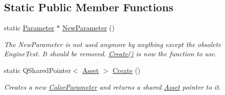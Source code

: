 \subsection*{Static Public Member Functions}
\begin{DoxyCompactItemize}
\item 
\hypertarget{class_picto_1_1_color_parameter_a620a0ea4319a5d851ea449c105bc42eb}{static \hyperlink{class_picto_1_1_parameter}{Parameter} $\ast$ \hyperlink{class_picto_1_1_color_parameter_a620a0ea4319a5d851ea449c105bc42eb}{New\-Parameter} ()}\label{class_picto_1_1_color_parameter_a620a0ea4319a5d851ea449c105bc42eb}

\begin{DoxyCompactList}\small\item\em The New\-Parameter is not used anymore by anything except the obsolete Engine\-Test. It should be removed. \hyperlink{class_picto_1_1_color_parameter_a0c217cb0d1bd0f8f74abdeaaf2055aff}{Create()} is now the function to use. \end{DoxyCompactList}\item 
\hypertarget{class_picto_1_1_color_parameter_a0c217cb0d1bd0f8f74abdeaaf2055aff}{static Q\-Shared\-Pointer$<$ \hyperlink{class_picto_1_1_asset}{Asset} $>$ \hyperlink{class_picto_1_1_color_parameter_a0c217cb0d1bd0f8f74abdeaaf2055aff}{Create} ()}\label{class_picto_1_1_color_parameter_a0c217cb0d1bd0f8f74abdeaaf2055aff}

\begin{DoxyCompactList}\small\item\em Creates a new \hyperlink{class_picto_1_1_color_parameter}{Color\-Parameter} and returns a shared \hyperlink{class_picto_1_1_asset}{Asset} pointer to it. \end{DoxyCompactList}\end{DoxyCompactItemize}
